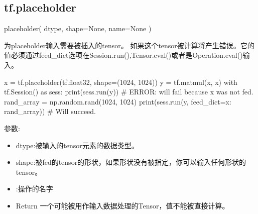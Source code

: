 \subsection{tf.placeholder}
\begin{python}
placeholder(
    dtype,
    shape=None,
    name=None
)
\end{python}
为placeholder输入需要被插入的tensor。
如果这个tensor被计算将产生错误。它的值必须通过feed\_dict选项在Session.run(),Tensor.eval()或者是Operation.eval()输入。
\begin{python}
x = tf.placeholder(tf.float32, shape=(1024, 1024))
y = tf.matmul(x, x)
with tf.Session() as sess:
    print(sess.run(y))  # ERROR: will fail because x was not fed.
    rand_array = np.random.rand(1024, 1024)
    print(sess.run(y, feed_dict={x: rand_array}))  # Will succeed.
\end{python}
参数:
\begin{itemize}
\item dtype:被输入的tensor元素的数据类型。
\item shape:被fed的tensor的形状，如果形状没有被指定，你可以输入任何形状的tensor。
\item:操作的名字
\item{Return} 一个可能被用作输入数据处理的Tensor，值不能被直接计算。
\end{itemize}
